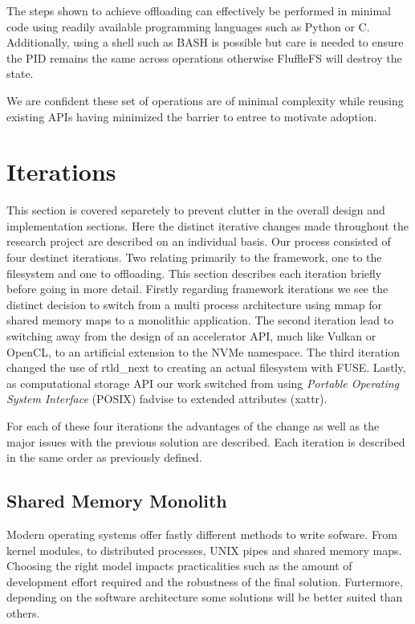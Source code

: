 The steps shown to achieve offloading can effectively be performed in
minimal code using readily available programming languages such as Python or C.
Additionally, using a shell such as BASH is possible but care is needed to
ensure the PID remains the same across operations otherwise FluffleFS will
destroy the state.

We are confident these set of operations are of minimal complexity while reusing
existing APIs having minimized the barrier to entree to motivate adoption.

\section{Iterations}

This section is covered separetely to prevent clutter in the overall design and
implementation sections. Here the distinct iterative changes made throughout the
research project are described on an individual basis. Our process consisted of
four destinct iterations. Two relating primarily to the framework, one to the
filesystem and one to offloading. This section describes each iteration briefly
before going in more detail. Firstly regarding framework iterations we see the
distinct decision to switch from a multi process architecture using mmap for
shared memory maps to a monolithic application. The second iteration lead to
switching away from the design of an accelerator API, much like Vulkan
\cite{vulkan} or OpenCL, to an artificial extension to the NVMe namespace.
The third iteration changed the use of rtld\_next \cite{rtldnext} to creating
an actual filesystem with FUSE. Lastly, as computational storage API our work
switched from using \textit{Portable Operating System Interface} (POSIX)
fadvise \cite{fadvise} to extended attributes (xattr).

For each of these four iterations the advantages of the change as well as the
major issues with the previous solution are described. Each iteration is
described in the same order as previously defined.

\subsection{Shared Memory Monolith}

Modern operating systems offer fastly different methods to write sofware. From
kernel modules, to distributed processes, UNIX pipes and shared memory maps.
Choosing the right model impacts practicalities such as the amount of
development effort required and the robustness of the final solution. 
Furtermore, depending on the software architecture some solutions will be better
suited than others.

